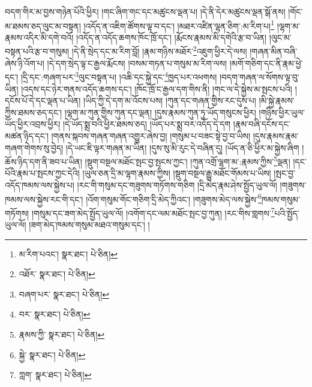 བདག་གིར་མ་བྱས་གཉེན་པོའི་ཕྱིར། །གང་ཞིག་གང་དང་མཚུངས་ལྡན་པ། །དེ་ནི་དེར་མཚུངས་ལྡན་སྒོ་ནས། །གོང་མ་ཐམས་ཅད་ལུང་མ་བསྟན། །འདོད་ན་འཇིག་ཚོགས་ལྟ་བ་དང་། །མཐར་འཛིན་ལྷན་ཅིག་:མ་རིག་པ།\footnote{མ་རིག་པའང་།  སྣར་ཐང་།  པེ་ཅིན། } །ལྷག་མ་རྣམས་འདིར་མི་དགེ་བའོ། །འདོད་ན་འདོད་ཆགས་ཁོང་ཁྲོ་དང་། །རྨོངས་རྣམས་མི་དགེའི་རྩ་བ་ཡིན། །ལུང་མ་བསྟན་པའི་རྩ་བ་གསུམ། །དེ་ནི་སྲེད་དང་མ་རིག་བློ། །རྣམ་གཉིས་མཐོར་\footnote{འཐོར་  སྣར་ཐང་།  པེ་ཅིན། }འཇུག་ཕྱིར་དེ་ལས། །གཞན་མིན་བཞི་ཞེས་ཉི་འོག་པ། །དེ་དག་སྲེད་ལྟ་ང་རྒྱལ་རྨོངས། །བསམ་གཏན་པ་གསུམ་མ་རིག་ལས། །མགོ་གཅིག་དང་ནི་རྣམ་ཕྱེ་དང་། །དྲི་དང་:གཞག་པར་\footnote{བཞག་པར་  སྣར་ཐང་།  པེ་ཅིན། }ལུང་བསྟན་པ། །འཆི་དང་སྐྱེ་དང་\footnote{བར་  སྣར་ཐང་།  པེ་ཅིན། }ཁྱད་པར་འཕགས། །བདག་གཞན་ལ་སོགས་ལྟ་བུ་ཡིན། །འདས་དང་ཉེར་གནས་འདོད་ཆགས་དང་། །ཁོང་ཁྲོ་ང་རྒྱལ་དག་གིས་ནི། །གང་ལ་དེ་སྐྱེས་མ་སྤངས་པའི། །དངོས་པོ་དེ་དང་ལྡན་པ་ཡིན། །ཡིད་ཀྱི་དེ་དག་མ་འོངས་པས། །ཀུན་དང་གཞན་གྱིས་རང་དུས་པ། །མི་སྐྱེ་རྣམས་ཀྱིས་ཐམས་ཅད་དང་། །ལྷག་མ་ཀུན་གྱིས་ཀུན་དང་ལྡན། །དུས་རྣམས་ཀུན་ཏུ་ཡོད་གསུངས་ཕྱིར། །གཉིས་ཕྱིར་ཡུལ་ཡོད་ཕྱིར་འབྲས་ཕྱིར། །དེ་ཡོད་སྨྲ་བའི་ཕྱིར་ཐམས་ཅད། །ཡོད་པར་སྨྲ་བར་འདོད་དེ་དག །རྣམ་བཞི་དངོས་དང་མཚན་ཉིད་དང་། །གནས་སྐབས་གཞན་གཞན་འགྱུར་ཞེས་བྱ། །གསུམ་པ་བཟང་སྟེ་བྱ་བ་ཡིས། །དུས་རྣམས་རྣམ་གཞག་གེགས་སུ་བྱེད། །དེ་ཡང་ཇི་ལྟར་གཞན་མ་ཡིན། །དུས་སུ་མི་རུང་དེ་བཞིན་དུ། །ཡོད་ན་ཅི་ཕྱིར་མ་སྐྱེས་ཞིག །ཆོས་ཉིད་དག་ནི་ཟབ་པ་ཡིན། །སྡུག་བསྔལ་མཐོང་སྤང་བྱ་སྤངས་ཀྱང་། །ཀུན་འགྲོ་ལྷག་མ་:རྣམས་ཀྱིས་\footnote{རྣམས་ཀྱི་  སྣར་ཐང་།  པེ་ཅིན། }ལྡན། །དང་པོའི་རྣམ་པ་སྤངས་ཀྱང་དེའི། །ཡུལ་ཅན་དྲི་མ་ལྷག་རྣམས་ཀྱིས། །སྡུག་བསྔལ་རྒྱུ་མཐོང་གོམས་པ་ཡིས། །སྤང་བྱ་འདོད་ཁམས་ལས་སྐྱེས་པ། །རང་གི་གསུམ་དང་གཟུགས་གཏོགས་གཅིག །དྲི་མེད་རྣམ་ཤེས་སྤྱོད་ཡུལ་ལོ། །གཟུགས་ཁམས་ལས་སྐྱེས་རང་གི་དང་། །འོག་གསུམ་གོང་གཅིག་དྲི་མེད་ཀྱིའང་། །གཟུགས་མེད་ལས་སྐྱེས་\footnote{སྐྱེ་  སྣར་ཐང་།  པེ་ཅིན། }ཁམས་གསུམ་གཏོགས། །གསུམ་དང་ཟག་མེད་སྤྱོད་ཡུལ་ལོ། །འགོག་དང་ལམ་མཐོང་སྤང་བྱ་ཀུན། །རང་གིས་གླགས་\footnote{ཀླག་  སྣར་ཐང་།  པེ་ཅིན། }པའི་སྤྱོད་ཡུལ་ལོ། །ཟག་མེད་ཁམས་གསུམ་མཐའ་གསུམ་དང་། །
